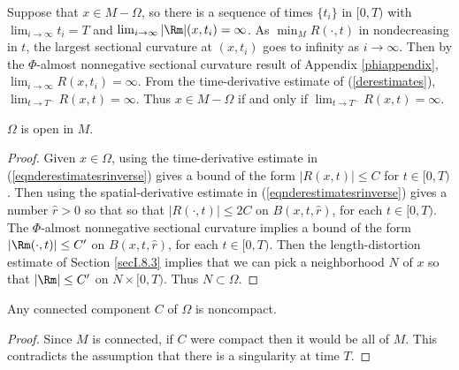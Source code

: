 Suppose that $x \in M - \Omega$, so there is a sequence of times $\{t_i\}$ in $[0,T)$ with
$\lim_{i \rightarrow \infty} t_i =T$  and
$\lim_{i \rightarrow \infty} |\Rm|(x,t_i) = \infty$. As $\min_M R(\cdot, t)$ in
nondecreasing in $t$, the largest sectional curvature at $(x, t_i)$
goes to infinity as $i \rightarrow \infty$. Then by the $\Phi$-almost nonnegative sectional
curvature result of Appendix \ref{phiappendix}, $\lim_{i \rightarrow \infty} R(x, t_i) = \infty$.
From the time-derivative estimate of (\ref{derestimates}), $\lim_{t \rightarrow T^-}
R(x,t) = \infty$. Thus $x \in M-\Omega$ if and only if $\lim_{t \rightarrow T^-}
R(x,t) = \infty$.

\begin{lemma}
  \label{lem:kl-structure-at-first-singularity-time-structure-at-first-singularity-time-lemma}
 \label{omegaopen}
$\Omega$ is open in $M$.
\end{lemma}
\begin{proof}
Given $x \in \Omega$, using the time-derivative estimate in
(\ref{eqnderestimatesrinverse})
gives a bound of the form $|R(x,t)| \le C$ for $t \in [0,T)$.
Then using the spatial-derivative estimate in
(\ref{eqnderestimatesrinverse}) gives
a number $\widehat{r} > 0$ so that
so that $|R(\cdot,t)| \le 2C$ on $B(x,t,\widehat{r})$, for each
$t \in [0, T)$.
The $\Phi$-almost nonnegative sectional
curvature implies a bound of the form $|\Rm(\cdot,t)| \le C^\prime$ on
$B(x,t,\widehat{r})$, for each
$t \in [0, T)$.
Then the length-distortion estimate of Section \ref{secI.8.3}
implies that we can pick a neighborhood $N$ of $x$ so that
$|\Rm| \le C^\prime$ on $N \times [0,T)$.
Thus $N \subset \Omega$.
\end{proof}


\begin{lemma}
  \label{lem:kl-structure-at-first-singularity-time-compactness-structure-at-first-singularity-time}
 \label{omeganoncompact}
Any connected component $C$ of $\Omega$ is noncompact.
\end{lemma}
\begin{proof}
Since $M$ is connected, if $C$ were
compact then it would  be all of $M$.  This contradicts the assumption that
there is a singularity at time $T$.
\end{proof}

